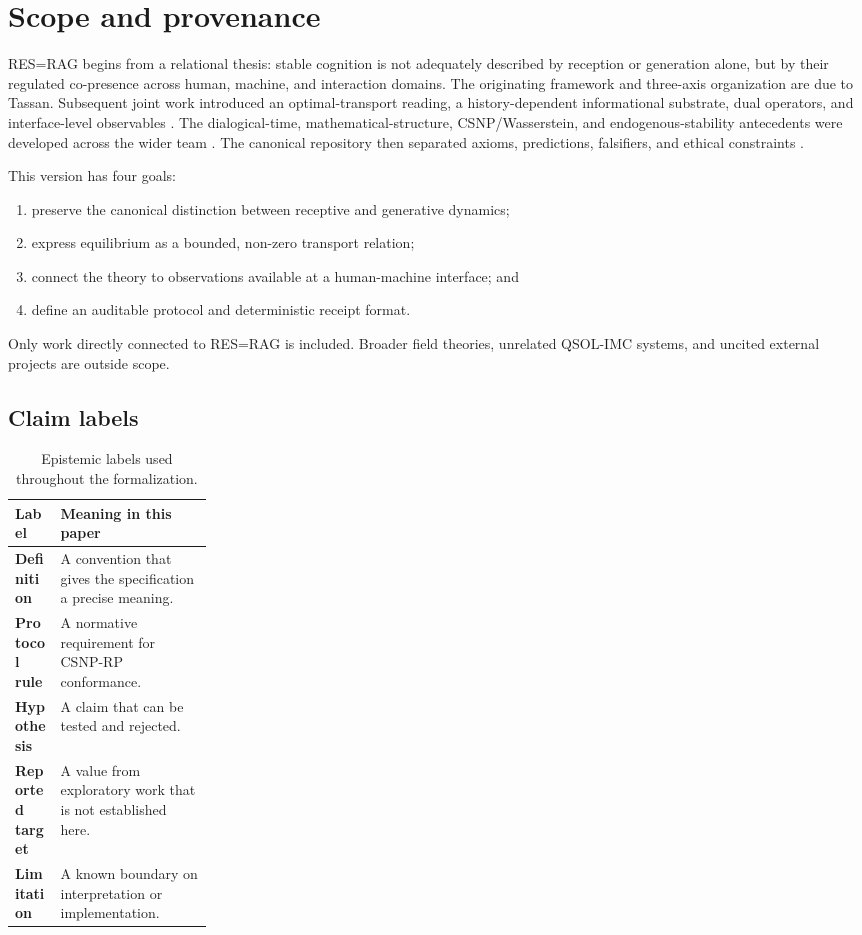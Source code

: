 \documentclass[11pt]{article}
\begin{document}
\section{Scope and provenance}

RES=RAG begins from a relational thesis: stable cognition is not adequately
described by reception or generation alone, but by their regulated
co-presence across human, machine, and interaction domains. The originating
framework and three-axis organization are due to Tassan. Subsequent joint
work introduced an optimal-transport reading, a history-dependent
informational substrate, dual operators, and interface-level observables
\citep{tassan-slade-dialogical,slade-tassan-substrate,slade-tassan-uftid}.
The dialogical-time, mathematical-structure, CSNP/Wasserstein, and
endogenous-stability antecedents were developed across the wider team
\citep{tassan-thebault-treal,resrag-tcfq,csnp-wasserstein,
team-endogenous-stability}.
The canonical repository then separated axioms, predictions, falsifiers, and
ethical constraints \citep{resrag-repository}.

This version has four goals:
\begin{enumerate}
  \item preserve the canonical distinction between receptive and generative
        dynamics;
  \item express equilibrium as a bounded, non-zero transport relation;
  \item connect the theory to observations available at a human-machine
        interface; and
  \item define an auditable protocol and deterministic receipt format.
\end{enumerate}

Only work directly connected to RES=RAG is included. Broader field theories,
unrelated QSOL-IMC systems, and uncited external projects are outside scope.

\subsection{Claim labels}

\begin{table}[ht]
\centering
\small
\begin{tabularx}{\linewidth}{>{\bfseries}p{0.23\linewidth}X}
\toprule
Label & Meaning in this paper\\
\midrule
Definition & A convention that gives the specification a precise meaning.\\
Protocol rule & A normative requirement for CSNP-RP conformance.\\
Hypothesis & A claim that can be tested and rejected.\\
Reported target & A value from exploratory work that is not established here.\\
Limitation & A known boundary on interpretation or implementation.\\
\bottomrule
\end{tabularx}
\caption{Epistemic labels used throughout the formalization.}
\label{tab:labels}
\end{table}
\end{document}
